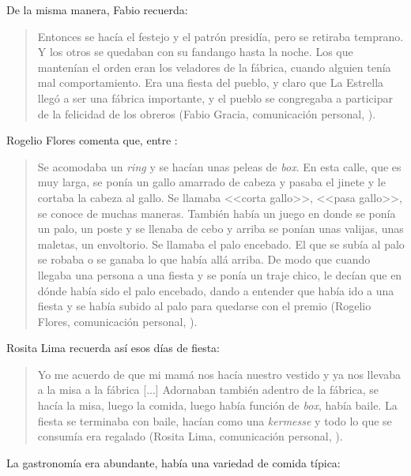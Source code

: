 \documentclass[14pt,letterpaper,twoside]{extbook} %
\begin{document}
\noindent De la misma manera, Fabio recuerda:

\begin{quotation}
\noindent Entonces se hacía el festejo y el patrón presidía, pero se retiraba temprano. Y los otros se quedaban con su fandango hasta la noche. Los que mantenían el orden eran los veladores de la fábrica, cuando alguien tenía mal comportamiento. Era una fiesta del pueblo, y claro que La Estrella llegó a ser una fábrica importante, y el pueblo se congregaba a participar de la felicidad de los obreros (Fabio Gracia, comunicación personal, ).
\end{quotation}

\noindent Rogelio Flores comenta que, entre :

\begin{quotation}
\noindent Se acomodaba un \textit{ring} y se hacían unas peleas de \textit{box}. En esta calle, que es muy larga, se ponía un gallo amarrado de cabeza y pasaba el jinete y le cortaba la cabeza al gallo. Se llamaba <<corta gallo>>, <<pasa gallo>>, se conoce de muchas maneras. También había un juego en donde se ponía un palo, un poste y se llenaba de cebo y arriba se ponían unas valijas, unas maletas, un
envoltorio. Se llamaba el palo encebado. El que se subía al palo se robaba o se ganaba lo que había allá arriba. De modo que cuando llegaba una persona a una fiesta y se ponía un traje chico, le decían que en dónde había sido el palo encebado, dando a entender que había ido a una fiesta y se había subido al palo para quedarse con el premio (Rogelio Flores, comunicación personal, ).
\end{quotation}

\noindent Rosita Lima recuerda así esos días de fiesta:

\begin{quotation}
\noindent Yo me acuerdo de que mi mamá nos hacía nuestro vestido y ya nos llevaba a la misa a la fábrica [...] Adornaban también adentro de la fábrica, se hacía la misa, luego la comida, luego había función de \textit{box}, había baile. La fiesta se terminaba con baile, hacían como una \textit{kermesse} y todo lo que se consumía era regalado (Rosita Lima, comunicación personal, ).
\end{quotation}

\noindent La gastronomía era abundante, había una variedad de comida típica:
\end{document}
